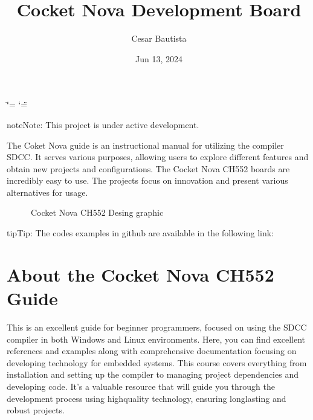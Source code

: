 \documentclass[letterpaper,10pt,english]{sphinxmanual}
\title{Cocket Nova Development Board}
\date{Jun 13, 2024}
\author{Cesar Bautista}
\begin{document}
\ifdefined\shorthandoff
  \ifnum\catcode`\=\string=\active\shorthandoff{=}\fi
  \ifnum\catcode`\"=\active{}\fi
\fi

\pagestyle{empty}
\sphinxmaketitle
\pagestyle{plain}
\sphinxtableofcontents
\pagestyle{normal}
\label{\detokenize{index::doc}}


\begin{sphinxadmonition}{note}{Note:}
\sphinxAtStartPar
This project is under active development.
\end{sphinxadmonition}

\sphinxAtStartPar
The Coket Nova guide is an instructional manual for utilizing the compiler SDCC. It serves various purposes, allowing users to explore different features and obtain new projects and
configurations.
The Cocket Nova CH552 boards are incredibly easy to use. The projects focus on innovation and
present various alternatives for usage.

\begin{figure}[htbp]
\centering
\capstart

\noindent{}
\caption{Cocket Nova CH552 Desing graphic}\label{\detokenize{index:id1}}\label{\detokenize{index:ch552}}\end{figure}

\begin{sphinxadmonition}{tip}{Tip:}
\sphinxAtStartPar
The codes examples in github are available in the following link: 
\end{sphinxadmonition}

\sphinxstepscope


\chapter{About the Cocket Nova CH552 Guide}
\label{\detokenize{about:about-the-cocket-nova-ch552-guide}}\label{\detokenize{about::doc}}
\sphinxAtStartPar
This is an excellent guide for beginner programmers, focused on using the SDCC compiler in both Windows and Linux environments.
Here, you can find excellent references and examples along with comprehensive documentation focusing on developing technology for embedded systems.
This course covers everything from installation and setting up the compiler to managing project dependencies and developing code. It’s a valuable resource that will guide you through the development process using high\sphinxhyphen{}quality technology, ensuring long\sphinxhyphen{}lasting and robust projects.
\end{document}
